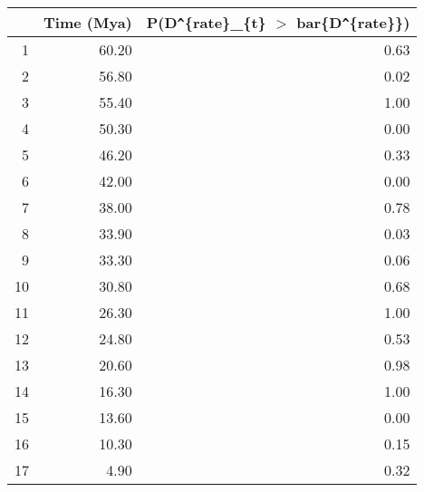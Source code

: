 \begin{table}[ht]
\centering
\begin{tabular}{rrr}
  \hline
 & Time (Mya) & P(D\verb|^|\{rate\}\_\{t\} $>$ bar\{D\verb|^|\{rate\}\}) \\ 
  \hline
1 & 60.20 & 0.63 \\ 
  2 & 56.80 & 0.02 \\ 
  3 & 55.40 & 1.00 \\ 
  4 & 50.30 & 0.00 \\ 
  5 & 46.20 & 0.33 \\ 
  6 & 42.00 & 0.00 \\ 
  7 & 38.00 & 0.78 \\ 
  8 & 33.90 & 0.03 \\ 
  9 & 33.30 & 0.06 \\ 
  10 & 30.80 & 0.68 \\ 
  11 & 26.30 & 1.00 \\ 
  12 & 24.80 & 0.53 \\ 
  13 & 20.60 & 0.98 \\ 
  14 & 16.30 & 1.00 \\ 
  15 & 13.60 & 0.00 \\ 
  16 & 10.30 & 0.15 \\ 
  17 & 4.90 & 0.32 \\ 
   \hline
\end{tabular}
\label{tab:rate_peak}
\end{table}
